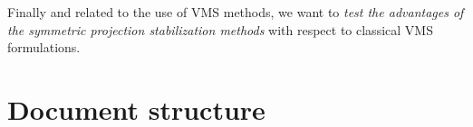 Finally and related to the use of VMS methods, we want to \emph{test the advantages of the symmetric projection stabilization methods} with respect to classical VMS formulations.
%
%
%
%
%

\section{Document structure}
